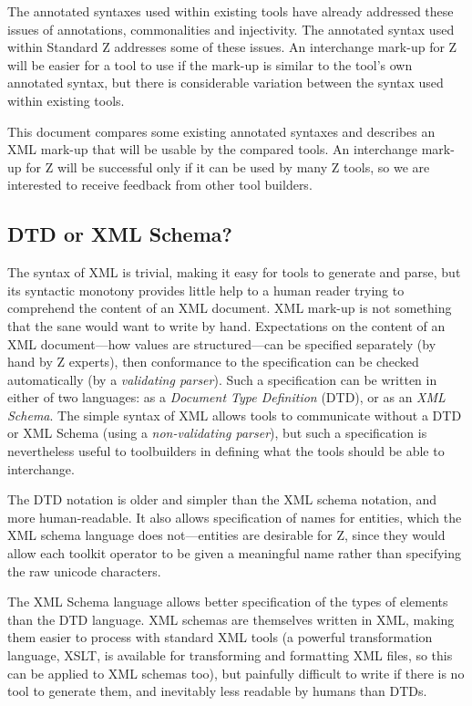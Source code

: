 \documentclass{llncs}  %
\begin{document}
\vspace{2ex}

The annotated syntaxes used within existing tools have already
addressed these issues of annotations, commonalities and injectivity.
The annotated syntax used within Standard Z addresses some of these issues.
An interchange mark-up for Z will be easier for a tool to use
if the mark-up is similar to the tool's own annotated syntax,
but there is considerable variation between the syntax used within existing
tools. 

This document compares some existing annotated syntaxes
and describes an XML mark-up that will be usable by the compared tools.
An interchange mark-up for Z will be successful only if
it can be used by many Z tools, so we are interested to 
receive feedback from other tool builders.


\subsection{DTD or XML Schema?}

The syntax of XML\cite{XML} is trivial,
making it easy for tools to generate and parse,
but its syntactic monotony provides little help to a human reader
trying to comprehend the content of an XML document.
XML mark-up is not something that the sane would want to write by hand.
Expectations on the content of an XML document---how values are
structured---can be specified separately (by hand by Z experts),
then conformance to the specification can be checked automatically
(by a \textit{validating parser}).
Such a specification can be written in either of two languages:
as a \textit{Document Type Definition} (DTD), or as an \textit{XML Schema}.
The simple syntax of XML allows tools to communicate
without a DTD or XML Schema (using a \textit{non-validating parser}),
but such a specification is nevertheless useful to toolbuilders
in defining what the tools should be able to interchange.

The DTD notation is older and simpler than the XML schema notation,
and more human-readable.  It also allows specification of names for
entities, which the XML schema language does not---entities are
desirable for Z, since they would allow each toolkit operator to be
given a meaningful name rather than specifying the raw unicode characters.

The XML Schema language allows better specification of the types
of elements than the DTD language.  
XML schemas are themselves written in XML, making them easier to
process with standard XML tools (a powerful transformation language, XSLT,
is available for transforming and formatting XML files, so this can be
applied to XML schemas too), but painfully difficult to write if there
is no tool to generate them, and inevitably less readable by humans than 
DTDs. 
\end{document}
